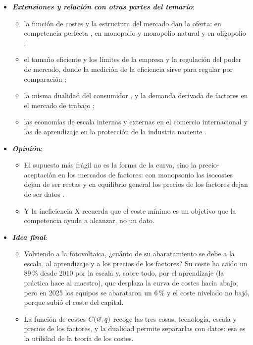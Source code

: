 \documentclass[11pt]{article}
\begin{document}
\begin{itemize}
  \begin{itemize}
  \item La estructura de costes decide cuántas empresas caben en un mercado y si conviene regularlo; los costes son la referencia de los reguladores (ingresos permitidos, comparación de eficiencias) y de las autoridades de competencia, y la base de la medición de la productividad.
  \end{itemize}
\item \textbf{\emph{Extensiones y relación con otras partes del temario}}:
  \begin{itemize}
  \item la función de costes y la estructura del mercado dan la oferta: en competencia perfecta , en monopolio y monopolio natural  y en oligopolio ;
  \item el tamaño eficiente y los límites de la empresa  y la regulación del poder de mercado, donde la medición de la eficiencia sirve para regular por comparación ;
  \item la misma dualidad del consumidor , y la demanda derivada de factores en el mercado de trabajo ;
  \item las economías de escala internas y externas en el comercio internacional  y las de aprendizaje en la protección de la industria naciente .
  \end{itemize}
\item \textbf{\emph{Opinión}}:
  \begin{itemize}
  \item El supuesto más frágil no es la forma de la curva, sino la precio-aceptación en los mercados de factores: con monopsonio las isocostes dejan de ser rectas  y en equilibrio general los precios de los factores dejan de ser datos .
  \item Y la ineficiencia X recuerda que el coste mínimo es un objetivo que la competencia ayuda a alcanzar, no un dato.
  \end{itemize}
\item \textbf{\emph{Idea final}}:
  \begin{itemize}
  \item Volviendo a la fotovoltaica, ¿cuánto de su abaratamiento se debe a la escala, al aprendizaje y a los precios de los factores? Su coste ha caído un 89\,\% desde 2010 por la escala y, sobre todo, por el aprendizaje (la práctica hace al maestro), que desplaza la curva de costes hacia abajo; pero en 2025 los equipos se abarataron un 6\,\% y el coste nivelado no bajó, porque subió el coste del capital\nocite{IRENA2026CostesGeneracion}.

  \item La función de costes $C(\vec{w},q)$ recoge las tres cosas, tecnología, escala y precios de los factores, y la dualidad permite separarlas con datos: esa es la utilidad de la teoría de los costes.
  \end{itemize}
\end{itemize}
\end{document}
